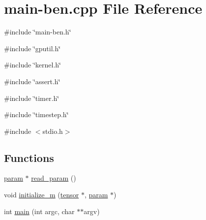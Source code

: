 \hypertarget{main-ben_8cpp}{
\section{main-\/ben.cpp File Reference}
\label{main-ben_8cpp}
}
{\ttfamily \#include \char`\"{}main-\/ben.h\char`\"{}}\par
{\ttfamily \#include \char`\"{}gputil.h\char`\"{}}\par
{\ttfamily \#include \char`\"{}kernel.h\char`\"{}}\par
{\ttfamily \#include \char`\"{}assert.h\char`\"{}}\par
{\ttfamily \#include \char`\"{}timer.h\char`\"{}}\par
{\ttfamily \#include \char`\"{}timestep.h\char`\"{}}\par
{\ttfamily \#include $<$stdio.h$>$}\par
\subsection*{Functions}
\begin{DoxyCompactItemize}
\item 
\hyperlink{structparam}{param} $\ast$ \hyperlink{main-ben_8cpp_acf175bfd69504d2109bb5f4fafc34125}{read\_\-param} ()
\item 
void \hyperlink{main-ben_8cpp_ac6cbfe6927d30143f6bac0e7be47e496}{initialize\_\-m} (\hyperlink{structtensor}{tensor} $\ast$, \hyperlink{structparam}{param} $\ast$)
\item 
int \hyperlink{main-ben_8cpp_a3c04138a5bfe5d72780bb7e82a18e627}{main} (int argc, char $\ast$$\ast$argv)
\end{DoxyCompactItemize}


